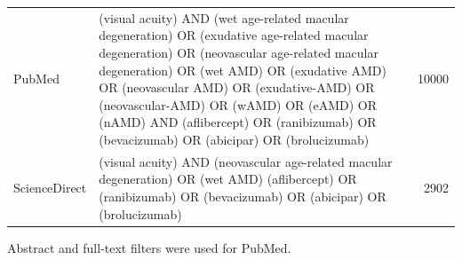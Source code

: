 \begin{table}[hb]
    \centering
    \label{tab:search-strategy}
    \begin{tabu}{l|X[2]|r}
        \toprule
         &  &  \\
        \midrule
        PubMed & {(visual acuity) AND (wet age-related macular degeneration) OR (exudative age-related macular degeneration) OR (neovascular age-related macular degeneration) OR (wet AMD) OR (exudative AMD) OR (neovascular AMD) OR (exudative-AMD) OR (neovascular-AMD) OR (wAMD) OR (eAMD) OR (nAMD) AND (aflibercept) OR (ranibizumab) OR (bevacizumab) OR (abicipar) OR (brolucizumab)} & \num{10000} \\
        \midrule
        ScienceDirect & {(visual acuity) AND (neovascular age-related macular degeneration) OR (wet AMD) (aflibercept) OR (ranibizumab) OR (bevacizumab) OR (abicipar) OR (brolucizumab)} & \num{2902} \\
        \bottomrule
    \end{tabu}
    \smallskip
    \small Abstract and full-text filters were used for PubMed.
\end{table}